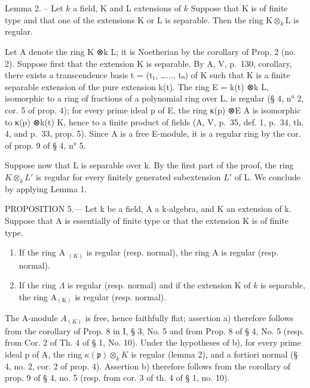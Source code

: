 Lemma 2. -- Let \(k\) a field, K and L extensions of \(k\) Suppose that K is of finite type and that one of the extensions K or L is separable. Then the ring \(\mathrm{K} \otimes_{k} \mathrm{L}\) is regular.

Let A denote the ring K ⊗k L; it is Noetherian by the corollary of Prop. 2 (no. 2). Suppose first that the extension K is separable. By A, V, p.~130, corollary, there exists a transcendence basis t = (t₁, \ldots..., tₙ) of K such that K is a finite separable extension of the pure extension k(t). The ring E = k(t) ⊗k L, isomorphic to a ring of fractions of a polynomial ring over L, is regular (§ 4, n° 2, cor. 5 of prop. 4); for every prime ideal p of E, the ring κ(p) ⊗E A is isomorphic to κ(p) ⊗k(t) K, hence to a finite product of fields (A, V, p.~35, def. 1, p.~34, th. 4, and p.~33, prop. 5). Since A is a free E-module, it is a regular ring by the cor. of prop. 9 of § 4, n° 5.

Suppose now that L is separable over k. By the first part of the proof, the ring \(K \otimes_{k} L'\) is regular for every finitely generated subextension \(L'\) of L. We conclude by applying Lemma 1.

PROPOSITION 5.--- Let k be a field, A a k-algebra, and K an extension of k. Suppose that A is essentially of finite type or that the extension K is of finite type.

\begin{enumerate}
\def\labelenumi{\alph{enumi})}
\item
  If the ring A \(_{(K)}\) is regular (resp. normal), the ring A is regular (resp. normal).
\item
  If the ring \(\Lambda\) is regular (resp. normal) and if the extension K of \(k\) is separable, the ring \(\mathrm{A}_{(\mathrm{K})}\) is regular (resp. normal).
\end{enumerate}

The A-module \(A_{(K)}\) is free, hence faithfully flat; assertion a) therefore follows from the corollary of Prop. 8 in I, § 3, No. 5 and from Prop. 8 of § 4, No. 5 (resp. from Cor. 2 of Th. 4 of § 1, No. 10). Under the hypotheses of b), for every prime ideal p of A, the ring \(\kappa(\mathfrak{p})\otimes_{k}K\) is regular (lemma 2), and a fortiori normal (§ 4, no. 2, cor. 2 of prop. 4). Assertion b) therefore follows from the corollary of prop. 9 of § 4, no. 5 (resp. from cor. 3 of th. 4 of § 1, no. 10).
\relax{}
